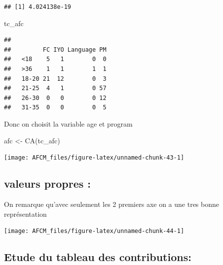 \documentclass[
]{article}
\newenvironment{Shaded}{\begin{snugshade}}{\end{snugshade}}
\newcommand{\DecValTok}[1]{\textcolor[rgb]{0.00,0.00,0.81}{#1}}
\newcommand{\FunctionTok}[1]{\textcolor[rgb]{0.00,0.00,0.00}{#1}}
\newcommand{\NormalTok}[1]{#1}
\newcommand{\OtherTok}[1]{\textcolor[rgb]{0.56,0.35,0.01}{#1}}
\newcommand{\SpecialCharTok}[1]{\textcolor[rgb]{0.00,0.00,0.00}{#1}}
\begin{document}
\begin{verbatim}
## [1] 4.024138e-19
\end{verbatim}

\begin{Shaded}
\begin{Highlighting}[]
\NormalTok{tc\_afc}
\end{Highlighting}
\end{Shaded}

\begin{verbatim}
##        
##         FC IYO Language PM
##   <18    5   1        0  0
##   >36    1   1        1  1
##   18-20 21  12        0  3
##   21-25  4   1        0 57
##   26-30  0   0        0 12
##   31-35  0   0        0  5
\end{verbatim}

Donc on choisit la variable age et program

\begin{Shaded}
\begin{Highlighting}[]
\NormalTok{afc }\OtherTok{\textless{}{-}} \FunctionTok{CA}\NormalTok{(tc\_afc)}
\end{Highlighting}
\end{Shaded}

\texttt{[image: AFCM\_files/figure-latex/unnamed-chunk-43-1]}

\hypertarget{valeurs-propres-1}{%
\subsection{valeurs propres :}\label{valeurs-propres-1}}

On remarque qu'avec seulement les 2 premiers axe on a une tres bonne
représentation

\begin{Shaded}
\end{Shaded}

\texttt{[image: AFCM\_files/figure-latex/unnamed-chunk-44-1]}

\hypertarget{etude-du-tableau-des-contributions-1}{%
\subsection{Etude du tableau des
contributions:}\label{etude-du-tableau-des-contributions-1}}
\end{document}
